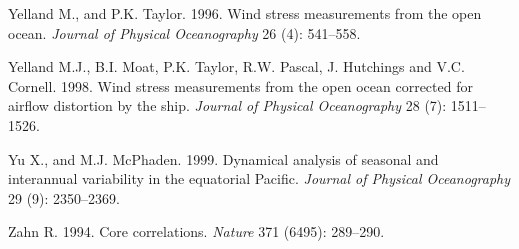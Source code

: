 \begin{thebibliography}{999}
Yelland M., and P.K. Taylor.  1996. Wind stress measurements from the
open ocean. \textit{Journal of Physical Oceanography} 26 (4):
541--558.
%

Yelland M.J., B.I. Moat, P.K. Taylor, R.W. Pascal, J. Hutchings and
V.C. Cornell. 1998. Wind stress measurements from the open ocean
corrected for airflow distortion by the ship. \textit{Journal of
  Physical Oceanography} 28 (7): 1511--1526.
%

Yu X., and M.J. McPhaden.  1999. Dynamical analysis of seasonal and
interannual variability in the equatorial Pacific. \textit{Journal of
  Physical Oceanography} 29 (9): 2350--2369.
%

Zahn R.  1994. Core correlations. \textit{Nature} 371 (6495):
289--290.
%
\end{thebibliography}

